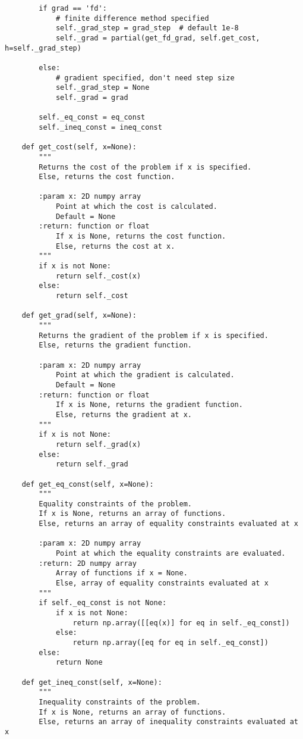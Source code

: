 \begin{lstlisting}
        if grad == 'fd':
            # finite difference method specified
            self._grad_step = grad_step  # default 1e-8
            self._grad = partial(get_fd_grad, self.get_cost, h=self._grad_step)

        else:
            # gradient specified, don't need step size
            self._grad_step = None
            self._grad = grad

        self._eq_const = eq_const
        self._ineq_const = ineq_const

    def get_cost(self, x=None):
        """
        Returns the cost of the problem if x is specified.
        Else, returns the cost function.

        :param x: 2D numpy array
            Point at which the cost is calculated.
            Default = None
        :return: function or float
            If x is None, returns the cost function.
            Else, returns the cost at x.
        """
        if x is not None:
            return self._cost(x)
        else:
            return self._cost

    def get_grad(self, x=None):
        """
        Returns the gradient of the problem if x is specified.
        Else, returns the gradient function.

        :param x: 2D numpy array
            Point at which the gradient is calculated.
            Default = None
        :return: function or float
            If x is None, returns the gradient function.
            Else, returns the gradient at x.
        """
        if x is not None:
            return self._grad(x)
        else:
            return self._grad

    def get_eq_const(self, x=None):
        """
        Equality constraints of the problem.
        If x is None, returns an array of functions.
        Else, returns an array of equality constraints evaluated at x

        :param x: 2D numpy array
            Point at which the equality constraints are evaluated.
        :return: 2D numpy array
            Array of functions if x = None.
            Else, array of equality constraints evaluated at x
        """
        if self._eq_const is not None:
            if x is not None:
                return np.array([[eq(x)] for eq in self._eq_const])
            else:
                return np.array([eq for eq in self._eq_const])
        else:
            return None

    def get_ineq_const(self, x=None):
        """
        Inequality constraints of the problem.
        If x is None, returns an array of functions.
        Else, returns an array of inequality constraints evaluated at x


\end{lstlisting}
